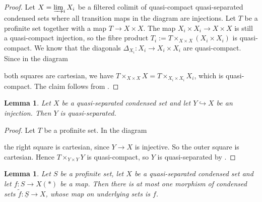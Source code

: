 \documentclass{amsart}
\newtheorem{lem}[prop]{Lemma}
\theoremstyle{definition}
\theoremstyle{remark}
\begin{document}
\begin{proof}
    Let $X = \varinjlim_i X_i$ be a filtered colimit of quasi-compact quasi-separated condensed sets where all transition maps in the diagram are injections.
    Let $T$ be a profinite set together with a map $T \to X \times X$.
    The map $X_i \times X_i \to X \times X$ is still a quasi-compact injection, so the fibre product $T_i := T \times_{X \times X} (X_i \times X_i)$ is quasi-compact. We know that the diagonals $\Delta_{X_i} : X_i \to X_i \times X_i$ are quasi-compact.
    Since in the diagram
    \begin{center}
    \end{center}
    both squares are cartesian, we have $T \times_{X \times X} X = T \times_{X_i \times X_i} X_i$, which is quasi-compact.
    The claim follows from .
\end{proof}

\begin{lem}\label{subsp_qs}
    Let $X$ be a quasi-separated condensed set and let $Y \hookrightarrow X$ be an injection.
    Then $Y$ is quasi-separated.
\end{lem}

\begin{proof}
    Let $T$ be a profinite set. In the diagram
    \begin{center}
    \end{center}
    the right square is cartesian, since $Y \to X$ is injective. So the outer square is cartesian.
    Hence $T \times_{Y \times Y} Y$ is quasi-compact, so $Y$ is quasi-separated by . 
\end{proof}

\begin{lem}\label{cond_set_unique}
    Let $S$ be a profinite set, let $X$ be a quasi-separated condensed set and let $f : S \to X(*)$ be a map.
    Then there is at most one morphism of condensed sets $\tilde f : \underline{S} \to X$, whose map on underlying sets is $f$.
\end{lem}
\end{document}
